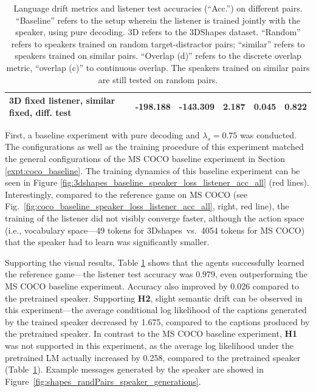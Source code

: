 \begin{table}[]
\begin{tabularx}{\textwidth}{|X|l|l|X|X|X|}
		3D fixed listener, similar fixed, diff. test & -198.188   & -143.309      & 2.187   & 0.045    & 0.822     \\ \hline
	\end{tabularx}
	\caption{\label{tab:3dshapes_drift_metrics_basic_baseline} Language drift metrics and listener test accuracies (``Acc.'') on different pairs. 
		``Baseline'' refers to the setup wherein the listener is trained jointly with the speaker, using pure decoding. 3D refers to the 3DShapes dataset. ``Random'' refers to speakers trained on random target-distractor pairs; ``similar'' refers to speakers trained on similar pairs. ``Overlap (d)'' refers to the discrete overlap metric, ``overlap (c)'' to continuous overlap. The speakers trained on similar pairs are still tested on random pairs.}
\end{table}

First, a baseline experiment with pure decoding and $\lambda_s = 0.75$ was conducted.
The configurations as well as the training procedure of this experiment matched the general configurations of the MS COCO baseline experiment in Section \ref{expt:coco_baseline}. The training dynamics of this baseline experiment can be seen in Figure \ref{fig:3dshapes_baseline_speaker_loss_listener_acc_all} (red lines). Interestingly, compared to the reference game on MS COCO (see Fig.~\ref{fig:coco_baseline_speaker_loss_listener_acc_all}, right, red line), the training of the listener did not visibly converge faster, although the action space (i.e., vocabulary space---49 tokens for 3Dshapes~vs.~4054 tokens for MS COCO) that the speaker had to learn was significantly smaller. 
 
Supporting the visual results, Table \ref{tab:3dshapes_drift_metrics_basic_baseline} shows that the agents successfully learned the reference game---the listener test accuracy was 0.979, even outperforming the MS COCO baseline experiment. Accuracy also improved by 0.026 compared to the pretrained speaker. 
Supporting \textbf{H2}, slight semantic drift can be observed in this experiment---the average conditional log likelihood of the captions generated by the trained speaker decreased by 1.675, compared to the captions produced by the pretrained speaker. In contrast to the MS COCO baseline experiment, \textbf{H1} was not supported in this experiment, as the average log likelihood under the pretrained LM actually increased by 0.258, compared to the pretrained speaker (Table~\ref{tab:3dshapes_drift_metrics_basic_baseline}). Example messages generated by the speaker are showed in Figure~\ref{fig:shapes_randPairs_speaker_generations}.

